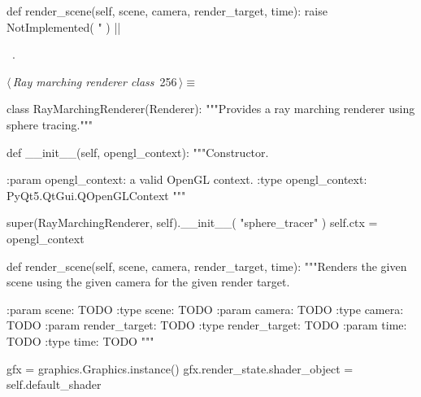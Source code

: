 \documentclass[%
    a4paper,    %
    justified,  %
    nobib,      %
    openany     %
]{tufte-book}
\makeatletter
\renewcommand{\label}[1]{\@tufte@label{##1}}%
\makeatother
\begin{document}
\begin{fullwidth}
\begin{flushleft}
\begin{minipage}{\linewidth}
\begin{pythoncode}
    def render_scene(self, scene, camera, render_target, time):
        raise NotImplemented(
            "%
        )
|\NWsep|
\end{pythoncode}
\vspace{1.5ex}
\footnotesize
\begin{list}{}{\setlength{\itemsep}{-\parsep}\setlength{\itemindent}{-\leftmargin}}
\item \NWtxtMacroRefIn\ .

\item{}
\end{list}
\end{minipage}\vspace{4ex}
\end{flushleft}
\begin{flushleft} \small
\begin{minipage}{\linewidth}\label{scrap283}\raggedright\small
{} $\langle\,${\itshape Ray marching renderer class}\nobreak\ {\footnotesize {256}}$\,\rangle\equiv$
\vspace{-1ex}
\begin{pythoncode}
class RayMarchingRenderer(Renderer):
    """Provides a ray marching renderer using sphere tracing."""

    def __init__(self, opengl_context):
        """Constructor.

        :param opengl_context: a valid OpenGL context.
        :type  opengl_context: PyQt5.QtGui.QOpenGLContext
        """

        super(RayMarchingRenderer, self).__init__(
            "sphere_tracer"
        )
        self.ctx = opengl_context

    def render_scene(self, scene, camera, render_target, time):
        """Renders the given scene using the given camera for the given render
        target.

        :param scene: TODO
        :type  scene: TODO
        :param camera: TODO
        :type  camera: TODO
        :param render_target: TODO
        :type  render_target: TODO
        :param time: TODO
        :type  time: TODO
        """

        gfx = graphics.Graphics.instance()
        gfx.render_state.shader_object = self.default_shader


\end{pythoncode}
\end{minipage}
\end{flushleft}
\end{fullwidth}
\end{document}
